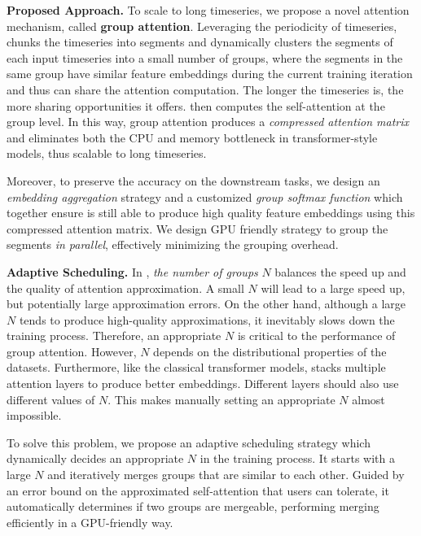 \noindent\textbf{Proposed Approach.} 
To scale \system to long timeseries, we  propose a novel attention mechanism, called {\bf group attention}. Leveraging the periodicity of timeseries, \system chunks the timeseries into segments and dynamically clusters the segments of each input timeseries into a small number of groups, where the segments in the same group have similar feature embeddings during the current training iteration and thus can share the attention computation. The longer the timeseries is, the more sharing opportunities it offers.
\system then computes the self-attention at the group level.
In this way, group attention produces a {\it compressed attention matrix} and eliminates both the CPU and memory bottleneck in transformer-style models, thus scalable to long timeseries.

Moreover, to preserve the accuracy on the downstream tasks, we design an {\it embedding aggregation} strategy and a customized {\it group softmax function} which together ensure \system is still able to produce high quality feature embeddings using this compressed attention matrix. 
We design GPU friendly strategy to group the segments {\it in parallel}, effectively minimizing the grouping overhead.

\textbf{Adaptive Scheduling.}
In \system, {\it the number of groups} $N$ balances the speed up and the quality of attention approximation. A small $N$ will lead to a large speed up, but potentially large approximation errors. On the other hand, although a large $N$ tends to produce high-quality approximations, it inevitably slows down the training process. Therefore, an appropriate $N$ is critical to the performance of group attention. However, $N$ depends on the distributional properties of the datasets. Furthermore, like the classical transformer models, \system stacks multiple attention layers to produce better embeddings. Different layers should also use different values of $N$. 
This makes manually setting an appropriate $N$ almost impossible. 

To solve this problem, we propose an adaptive scheduling strategy which dynamically decides an appropriate $N$ in the training process. It starts with a large $N$ and iteratively merges groups that are similar to each other. Guided by an error bound on the approximated self-attention that users can tolerate, it automatically determines if two groups are mergeable, performing merging efficiently in a GPU-friendly way. 

